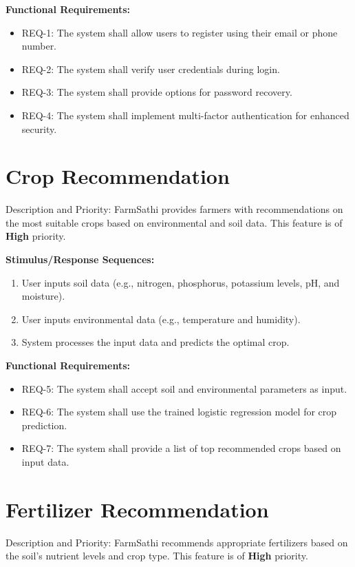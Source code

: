 \documentclass{scrreprt}
\begin{document}
\textbf{Functional Requirements:}  
\begin{itemize}
    \item REQ-1: The system shall allow users to register using their email or phone number.
    \item REQ-2: The system shall verify user credentials during login.
    \item REQ-3: The system shall provide options for password recovery.
    \item REQ-4: The system shall implement multi-factor authentication for enhanced security.
\end{itemize}

\section{Crop Recommendation}
Description and Priority:  
FarmSathi provides farmers with recommendations on the most suitable crops based on environmental and soil data. This feature is of \textbf{High} priority.
\newline

\textbf{Stimulus/Response Sequences:}  
\begin{enumerate}
    \item User inputs soil data (e.g., nitrogen, phosphorus, potassium levels, pH, and moisture).
    \item User inputs environmental data (e.g., temperature and humidity).
    \item System processes the input data and predicts the optimal crop.
\end{enumerate}

\textbf{Functional Requirements:}  
\begin{itemize}
    \item REQ-5: The system shall accept soil and environmental parameters as input.
    \item REQ-6: The system shall use the trained logistic regression model for crop prediction.
    \item REQ-7: The system shall provide a list of top recommended crops based on input data.
\end{itemize}

\section{Fertilizer Recommendation}
Description and Priority:  
FarmSathi recommends appropriate fertilizers based on the soil's nutrient levels and crop type. This feature is of \textbf{High} priority.
\newline
\end{document}

